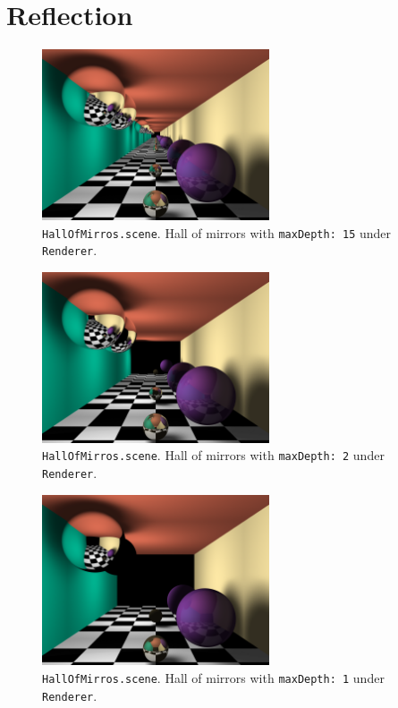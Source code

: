 \documentclass{article}
\begin{document}
\section{Reflection}

\begin{figure}[H]
    \centering
    \includegraphics[width=0.6\textwidth]{./examples/HallOfMirrors.png}
    \caption{\texttt{HallOfMirros.scene}. Hall of mirrors with \texttt{maxDepth: 15} under \texttt{Renderer}.}
\end{figure}

\begin{figure}[H]
    \centering
    \includegraphics[width=0.6\textwidth]{./examples/HallOfMirrorsDepth2.png}
    \caption{\texttt{HallOfMirros.scene}. Hall of mirrors with \texttt{maxDepth: 2} under \texttt{Renderer}.}
\end{figure}

\begin{figure}[H]
    \centering
    \includegraphics[width=0.6\textwidth]{./examples/HallOfMirrorsDepth3.png}
    \caption{\texttt{HallOfMirros.scene}. Hall of mirrors with \texttt{maxDepth: 1} under \texttt{Renderer}.}
\end{figure}
\end{document}
